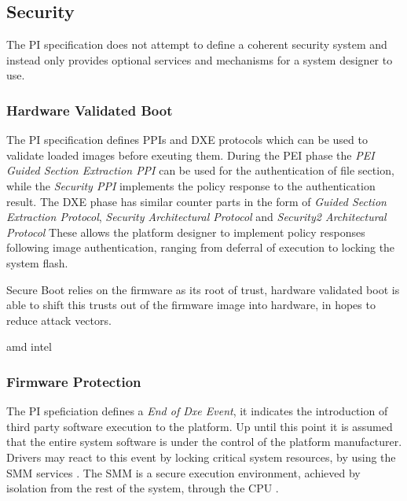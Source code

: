 
\subsection{Security}

The \ac{PI} specification does not attempt to define a coherent security system and instead only provides optional services and mechanisms for a system designer to use.

\subsubsection{Hardware Validated Boot}

The \ac{PI} specification defines \acp{PPI} and \ac{DXE} protocols which can be used to validate loaded images before exeuting them.
During the \ac{PEI} phase the \emph{\ac{PEI} Guided Section Extraction \ac{PPI}} can be used for the authentication of file section, while the \emph{Security \ac{PPI}} implements the policy response to the authentication result.
The \ac{DXE} phase has similar counter parts in the form of \emph{Guided Section Extraction Protocol}, \emph{Security Architectural Protocol} and \emph{Security2 Architectural Protocol}
These allows the platform designer to implement policy responses following image authentication, ranging from deferral of execution to locking the system flash.


Secure Boot relies on the firmware as its root of trust, hardware validated boot is able to shift this trusts out of the firmware image into hardware, in hopes to reduce attack vectors.


amd
intel

\subsubsection{Firmware Protection}

The \ac{PI} speficiation defines a \emph{End of Dxe Event}, it indicates the introduction of third party software execution to the platform.
Up until this point it is assumed that the entire system software is under the control of the platform manufacturer.
Drivers may react to this event by locking critical system resources, by using the \ac{SMM} services \cite[Vol. 2, 5.1.2.1]{pi-spec}.
The \ac{SMM} is a secure execution environment, achieved by isolation from the rest of the system, through the \ac{CPU} \cite[Vol. 4, Section 1.3]{pi-spec}.





